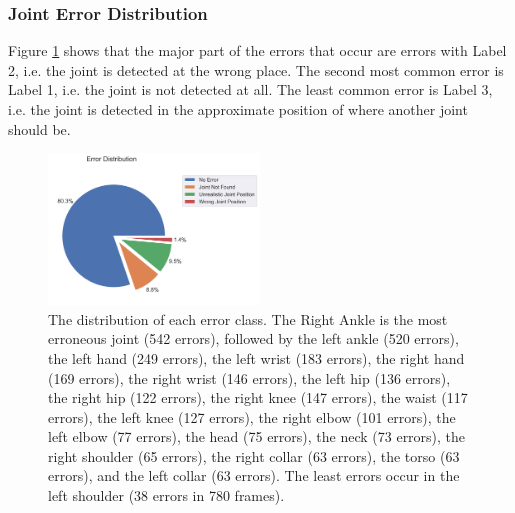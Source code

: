 \subsubsection{Joint Error Distribution}

Figure \ref{fig:jt_pie} shows that the major part of the errors that occur are errors with Label 2, i.e. the joint is detected at the wrong place. The second most common error is Label 1, i.e. the joint is not detected at all. The least common error is Label 3, i.e. the joint is detected in the approximate position of where another joint should be.

\begin{figure}[ht]
  \centering
  \includegraphics[width=0.5\textwidth]{figures/Data/dist_joints/Error_Distribution.png}
  \caption[Error Distribution for each error class]{The distribution of each error class. The Right Ankle is the most erroneous joint (542 errors), followed by the left ankle (520 errors), the left hand (249 errors), the left wrist (183 errors), the right hand (169 errors), the right wrist (146 errors), the left hip (136 errors), the right hip (122 errors), the right knee (147 errors), the waist (117 errors), the left knee (127 errors), the right elbow (101 errors), the left elbow (77 errors), the head (75 errors), the neck (73 errors), the right shoulder (65 errors), the right collar (63 errors), the torso (63 errors), and the left collar (63 errors). The least errors occur in the left shoulder (38 errors in 780 frames).}
  \label{fig:jt_pie}
\end{figure}

